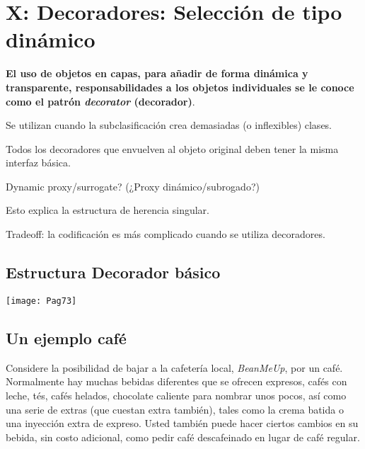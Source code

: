 \section*{\texorpdfstring{X: Decoradores: \newline  Selección de tipo dinámico}{X: Decoradores:  Selección Tipo dinámico}}
\label{sec:xdstd}


\textbf{El uso de objetos en capas, para añadir de forma dinámica y transparente, responsabilidades a los objetos individuales se le conoce como el patrón \textit{decorator} (decorador)}. \newline

Se utilizan cuando la subclasificación crea demasiadas (o inflexibles) clases.   \newline

Todos los decoradores que envuelven al objeto original deben tener la misma interfaz básica. \newline

Dynamic proxy/surrogate? (¿Proxy dinámico/subrogado?)  \newline

Esto explica la estructura de herencia singular.    \newline

Tradeoff:  la codificación es más complicado cuando se utiliza decoradores.

\newpage

\subsection*{Estructura Decorador básico}
\label{subsec:edb}

\texttt{[image: Pag73]}

\subsection*{Un ejemplo café}
\label{subsec:uec}

Considere la posibilidad de bajar a la cafetería local, \textit{BeanMeUp}, por un café. Normalmente hay muchas bebidas diferentes que se ofrecen \-\- expresos, cafés con leche, tés, cafés helados, chocolate caliente para nombrar unos pocos, así como una serie de extras (que cuestan extra también), tales como la crema batida o una inyección extra de expreso. Usted también puede hacer ciertos cambios en su bebida, sin costo adicional, como pedir café descafeinado en lugar de café regular.     \newline

